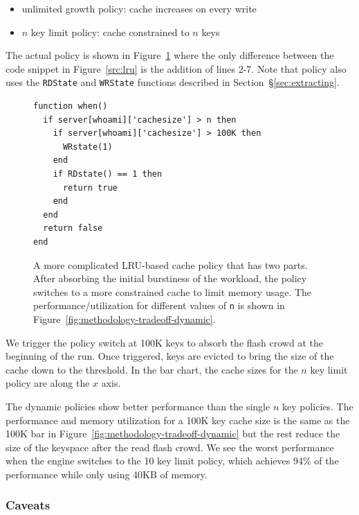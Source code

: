 \begin{itemize}
  \item unlimited growth policy: cache increases on every write
  \item \(n\) key limit policy: cache constrained to \(n\) keys
\end{itemize}

The actual policy is shown in Figure~\ref{src:lru-dyn} where the only
difference between the code snippet in Figure~\ref{src:lru} is the addition of
lines 2-7. Note that policy also uses the \texttt{RDState} and \texttt{WRState}
functions described in Section~\S\ref{sec:extracting}.

\begin{figure}[t]
\footnotesize
\centering
\begin{verbatim}
function when()
  if server[whoami]['cachesize'] > n then
    if server[whoami]['cachesize'] > 100K then
      WRstate(1)
    end
    if RDstate() == 1 then
      return true
    end
  end
  return false
end
\end{verbatim}
\caption{A more complicated LRU-based cache policy that has two parts. After
absorbing the initial burstiness of the workload, the policy switches to a more
constrained cache to limit memory usage. The performance/utilization for
different values of \texttt{n} is shown in
Figure~\ref{fig:methodology-tradeoff-dynamic}. \label{src:lru-dyn}}
\end{figure}

We trigger the policy switch at 100K keys to absorb the flash crowd at the
beginning of the run. Once triggered, keys are evicted to bring the size of the
cache down to the threshold.  In the bar chart, the cache sizes for the \(n\)
key limit policy are along the \(x\) axis.

The dynamic policies show better performance than the single \(n\) key
policies. The performance and memory utilization for a 100K key cache size is
the same as the 100K bar in Figure~\ref{fig:methodology-tradeoff-dynamic} but
the rest reduce the size of the keyspace after the read flash crowd.  We see
the worst performance when the engine switches to the 10 key limit policy,
which achieves 94\% of the performance while only using 40KB of memory. 

\subsubsection*{Caveats}

